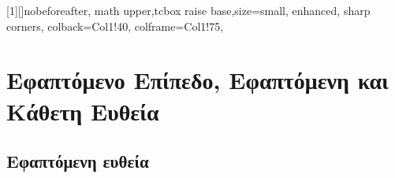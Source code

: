 




\newtcbox{\mathboxrr}[1][]{nobeforeafter, math upper,tcbox raise base,size=small,
          enhanced, sharp corners, colback=Col1!40, colframe=Col1!75,
        }

\newcommand{\twocolumnsidescc}[2]{\begin{minipage}[c]{0.72\linewidth}\raggedright
        #1
        \end{minipage}\hfill\begin{minipage}[c]{0.27\linewidth}\raggedright
        #2
    \end{minipage}
}



\usepackage{wrapfig}

\pagestyle{vangelis}
\everymath{\displaystyle}
\setcounter{chapter}{1}





\chapter*{Εφαπτόμενο Επίπεδο, Εφαπτόμενη και Κάθετη Ευθεία}

\section*{Εφαπτόμενη ευθεία}


